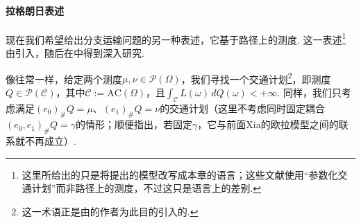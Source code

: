\paragraph{拉格朗日表述}
现在我们希望给出分支运输问题的另一种表述，它基于路径上的测度. 这一表述\footnote{这里所给出的只是将\cite{b48,b221}提出的模型改写成本章的语言；这些文献使用“参数化交通计划”而非路径上的测度，不过这只是语言上的差别.}由\cite{b221}引入，随后在\cite{b48}中得到深入研究.

\label{idx:root4-p168-traffic-plan}像往常一样，给定两个测度$\mu,\nu\in\mathscr P(\Omega)$，我们寻找一个交通计划\footnote{这一术语正是由\cite{b48}的作者为此目的引入的.}，即测度$Q\in\mathscr P(\mathscr C)$，其中$\mathscr C:=\mathrm{AC}(\Omega)$，且$\int_\mathscr C L(\omega)\,dQ(\omega)<+\infty$. 同样，我们只考虑满足$(e_0)_\#Q=\mu$、$(e_1)_\#Q=\nu$的交通计划（这里不考虑同时固定耦合$(e_0,e_1)_\#Q=\gamma$的情形；顺便指出，若固定$\gamma$，它与前面Xia的欧拉模型之间的联系就不再成立）.

